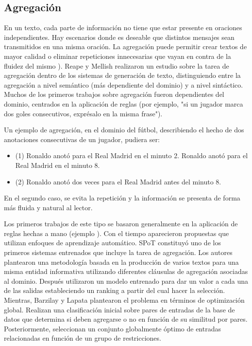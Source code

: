 \subsection{Agregación}\label{subsection:agregacion}

    En un texto, cada parte de información no tiene que estar presente en oraciones independientes. Hay escenarios donde es 
deseable que distintos mensajes sean transmitidos en una misma oraci\'on. La agregaci\'on puede permitir crear textos de mayor 
calidad o eliminar repeticiones innecesarias que vayan en contra de la fluidez del mismo ). Reape y Mellish 
realizaron un estudio sobre la tarea de agregación dentro de los sistemas de generación de texto, distinguiendo entre la agregación a nivel semántico (más dependiente del dominio)
y a nivel sintáctico. Muchos de los primeros trabajos sobre agregación fueron dependientes del dominio, centrados en la aplicación de reglas 
(por ejemplo, "si un jugador marca dos goles consecutivos, expr\'esalo en la misma frase"). 

    Un ejemplo de agregaci\'on, en el dominio del f\'utbol, describiendo el hecho de dos anotaciones consecutivas de un jugador, pudiera ser:

\begin{itemize}
    \item (1) Ronaldo anot\'o para el Real Madrid en el minuto 2. Ronaldo anot\'o para el Real Madrid en el minuto 8.
    \item (2) Ronaldo anot\'o dos veces para el Real Madrid antes del minuto 8.
\end{itemize}

    En el segundo caso, se evita la repetici\'on y la información se presenta de forma m\'as fluida y natural al lector.
    
Los primeros trabajos de este tipo se basaron generalmente en la aplicación de reglas hechas a mano (ejemplo ). Con el tiempo aparecieron propuestas que 
utilizan enfoques de aprendizaje autom\'atico. SPoT  constituyó uno de los primeros sistemas entrenados que incluye la tarea de agregación. 
Los autores plantearon una metodolog\'ia basada en la producci\'on de varios textos para una misma entidad informativa utilizando diferentes cl\'ausulas de agregación asociadas al dominio. Despu\'es utilizaron un modelo 
entrenado para dar un valor a cada una de las salidas estableciendo un ranking a partir del cual hacer la selección. Mientras, Barzilay y Lapata 
plantearon el problema en términos de optimización global. Realizan una clasificación inicial sobre pares de entradas de la base de datos que determina 
si deben agregarse o no en función de su similitud por pares. Posteriormente, seleccionan un conjunto globalmente óptimo de entradas relacionadas en función
de un grupo de restricciones.

